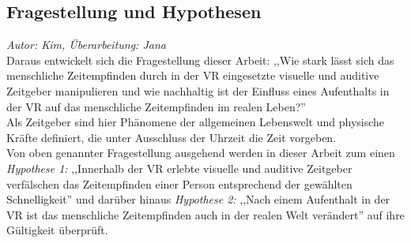 \documentclass{Paper}
\begin{document}
\subsection{Fragestellung und Hypothesen}
\textit{Autor: Kim, Überarbeitung: Jana}\\
Daraus entwickelt sich die Fragestellung dieser Arbeit: ,,Wie stark lässt sich das menschliche Zeitempfinden durch in der VR eingesetzte visuelle und auditive Zeitgeber manipulieren und wie nachhaltig ist der Einfluss eines Aufenthalts in der VR auf das menschliche Zeitempfinden im realen Leben?''\\
Als Zeitgeber sind hier Phänomene der allgemeinen Lebenswelt und physische Kräfte definiert, die unter Ausschluss der Uhrzeit die Zeit vorgeben.\\
Von oben genannter Fragestellung ausgehend werden in dieser Arbeit zum einen \textit{Hypothese 1:} ,,Innerhalb der VR erlebte visuelle und auditive Zeitgeber verfälschen das Zeitempfinden einer Person entsprechend der gewählten Schnelligkeit'' und darüber hinaus \textit{Hypothese 2:} ,,Nach einem Aufenthalt in der VR ist das menschliche Zeitempfinden auch in der realen Welt verändert'' auf ihre Gültigkeit überprüft.
 

 


\end{document}
